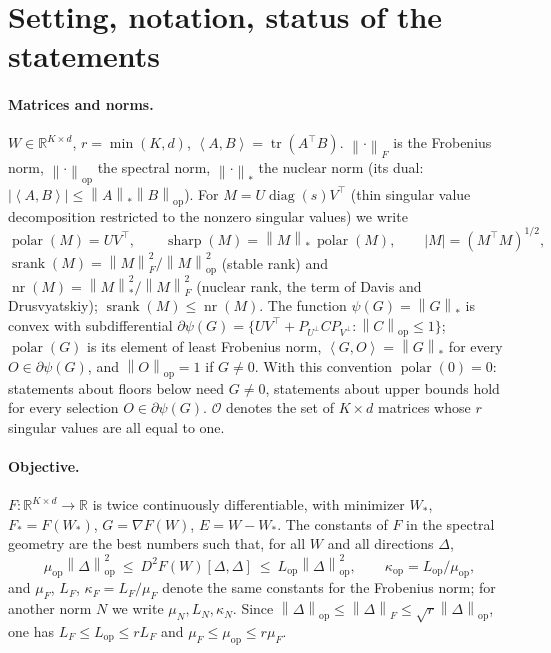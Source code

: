 \documentclass[11pt]{article}
\theoremstyle{definition}
\theoremstyle{remark}
\newcommand{\R}{\mathbb{R}}
\newcommand{\nop}[1]{\left\|#1\right\|_{\mathrm{op}}}
\newcommand{\nnuc}[1]{\left\|#1\right\|_{*}}
\newcommand{\nF}[1]{\left\|#1\right\|_{F}}
\newcommand{\inner}[2]{\left\langle #1, #2 \right\rangle}
\newcommand{\abs}[1]{\left|#1\right|}
\newcommand{\tr}{\operatorname{tr}}
\newcommand{\diag}{\operatorname{diag}}
\newcommand{\polar}{\operatorname{polar}}
\newcommand{\sharpop}{\operatorname{sharp}}
\newcommand{\srank}{\operatorname{srank}}
\newcommand{\nr}{\operatorname{nr}}
\newcommand{\Lop}{L_{\mathrm{op}}}
\newcommand{\muop}{\mu_{\mathrm{op}}}
\newcommand{\kop}{\kappa_{\mathrm{op}}}
\newcommand{\kF}{\kappa_{F}}
\newcommand{\cO}{\mathcal{O}}
\begin{document}
\tableofcontents

\section{Setting, notation, status of the statements}\label{sec:setting}

\paragraph{Matrices and norms.} $W\in\R^{K\times d}$, $r=\min(K,d)$, $\inner{A}{B}=\tr(A^\top B)$. $\nF{\cdot}$ is the
Frobenius norm, $\nop{\cdot}$ the spectral norm, $\nnuc{\cdot}$ the nuclear norm (its dual:
$\abs{\inner AB}\le\nnuc A\nop B$). For $M=U\diag(s)V^\top$ (thin singular value decomposition restricted to the nonzero
singular values) we write
\[
\polar(M)=UV^\top,\qquad \sharpop(M)=\nnuc M\,\polar(M),\qquad \abs{M}=(M^\top M)^{1/2},
\]
$\srank(M)=\nF M^2/\nop M^2$ (stable rank) and $\nr(M)=\nnuc M^2/\nF M^2$ (nuclear rank, the term of Davis and
Drusvyatskiy); $\srank(M)\le\nr(M)$. The function $\psi(G)=\nnuc G$ is convex with subdifferential
$\partial\psi(G)=\{UV^\top+P_{U^\perp}CP_{V^\perp}:\nop C\le1\}$; $\polar(G)$ is its element of least Frobenius norm,
$\inner GO=\nnuc G$ for every $O\in\partial\psi(G)$, and $\nop O=1$ if $G\ne0$. With this convention $\polar(0)=0$:
statements about floors below need $G\ne0$, statements about upper bounds hold for every selection
$O\in\partial\psi(G)$. $\cO$ denotes the set of $K\times d$ matrices whose $r$ singular values are all equal to one.

\paragraph{Objective.} $F:\R^{K\times d}\to\R$ is twice continuously differentiable, with minimizer $W_\ast$,
$F_\ast=F(W_\ast)$, $G=\nabla F(W)$, $E=W-W_\ast$. The constants of $F$ in the spectral geometry are the best numbers
such that, for all $W$ and all directions $\Delta$,
\begin{equation}\label{eq:consts}
\muop\nop\Delta^2\ \le\ D^2F(W)[\Delta,\Delta]\ \le\ \Lop\nop\Delta^2,\qquad \kop=\Lop/\muop ,
\end{equation}
and $\mu_F$, $L_F$, $\kF=L_F/\mu_F$ denote the same constants for the Frobenius norm; for another norm $N$ we write
$\mu_N,L_N,\kappa_N$. Since $\nop\Delta\le\nF\Delta\le\sqrt r\nop\Delta$, one has $L_F\le\Lop\le rL_F$ and
$\mu_F\le\muop\le r\mu_F$.
\end{document}
